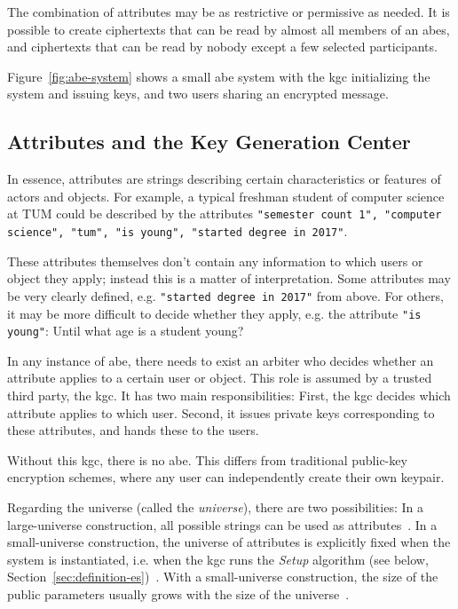 The combination of attributes may be as restrictive or permissive as needed.
It is possible to create ciphertexts that can be read by almost all members of an \acrshort{abes}, and ciphertexts that can be read by nobody except a few selected participants.

Figure~\ref{fig:abe-system} shows a small \acrshort{abe} system with the \acrshort{kgc} initializing the system and issuing keys, and two users sharing an encrypted message.
\subsection{Attributes and the Key Generation Center}\label{sec:kgc}



In essence, attributes are strings describing certain characteristics or features of actors and objects.
For example, a typical freshman student of computer science at TUM could be described by the attributes \texttt{"semester count 1", "computer science", "tum", "is young", "started degree in 2017"}.

These attributes themselves don't contain any information to which users or object they apply; instead this is a matter of interpretation.
Some attributes may be very clearly defined, e.g. \texttt{"started degree in 2017"} from above.
For others, it may be more difficult to decide whether they apply, e.g. the attribute \texttt{"is young"}: Until what age is a student young?

In any instance of \acrshort{abe}, there needs to exist an arbiter who decides whether an attribute applies to a certain user or object.
This role is assumed by a trusted third party, the \acrfull{kgc}.
It has two main responsibilities: First, the \acrshort{kgc} decides which attribute applies to which user.
Second, it issues private keys corresponding to these attributes, and hands these to the users.

Without this \acrshort{kgc}, there is no \acrshort{abe}.
This differs from traditional public-key encryption schemes, where any user can independently create their own keypair.

Regarding the \glsdesc{universe} (called the \emph{\gls{universe}}), there are two possibilities:
In a \gls{large-universe} construction, all possible strings can be used as attributes~\cite{goyal_attribute-based_2006}.
In a \gls{small-universe} construction, the universe of attributes is explicitly fixed when the system is instantiated, i.e. when the \acrshort{kgc} runs the \emph{Setup} algorithm (see below, Section~\ref{sec:definition-es})~\cite{goyal_attribute-based_2006}.
With a \gls{small-universe} construction, the size of the public parameters usually grows with the size of the \gls{universe}~\cite{goyal_attribute-based_2006}.

